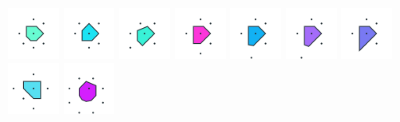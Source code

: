 \documentclass[text.tex]{subfiles}
\begin{document}
\begin{figure}[h!]
\includegraphics[width=0.12\textwidth]{img/results/circle8/circle8_116260_(-4522_1875alpha_4)_005.pdf}
\includegraphics[width=0.12\textwidth]{img/results/circle8/circle8_116260_(-4522_1875alpha_4)_006.pdf}
\includegraphics[width=0.12\textwidth]{img/results/circle8/circle8_116260_(-4522_1875alpha_4)_007.pdf}
\includegraphics[width=0.12\textwidth]{img/results/circle8/circle8_116260_(-4522_1875alpha_4)_008.pdf}
\includegraphics[width=0.12\textwidth]{img/results/circle8/circle8_116260_(-4522_1875alpha_4)_009.pdf}
\includegraphics[width=0.12\textwidth]{img/results/circle8/circle8_116260_(-4522_1875alpha_4)_010.pdf}
\includegraphics[width=0.12\textwidth]{img/results/circle8/circle8_116260_(-4522_1875alpha_4)_011.pdf}
\includegraphics[width=0.12\textwidth]{img/results/circle8/circle8_116260_(-4522_1875alpha_4)_012.pdf}
\includegraphics[width=0.12\textwidth]{img/results/circle8/circle8_116260_(-4522_1875alpha_4)_013.pdf}
\end{figure}
\end{document}
